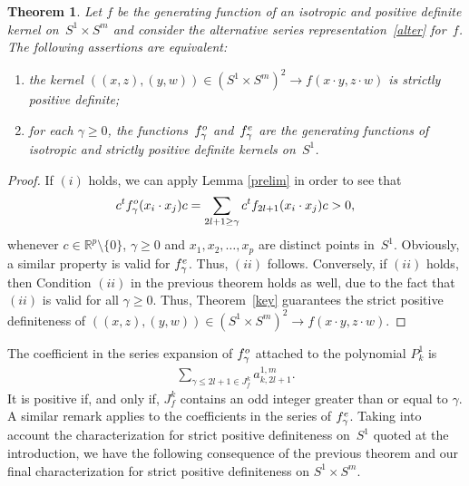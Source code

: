 \documentclass[11pt]{article}
\numberwithin{equation}{section}
\newtheorem{Theorem}{Theorem}[section]
\begin{document}
\begin{Theorem}
Let $f$ be the generating function of an isotropic and positive definite kernel on~\mbox{$S^1 \times S^m$} and consider the alternative series representation~\eqref{alter} for~$f$. The following assertions are equivalent:
\begin{enumerate}\itemsep=0pt
\item[$(i)$] the kernel $((x,z), (y,w)) \in (S^1 \times S^m)^2 \to f(x \cdot y, z \cdot w)$ is strictly positive definite;
\item[$(ii)$] for each $\gamma \geq 0$, the functions~$f_\gamma^{\rm o}$ and~$f_{\gamma}^{\rm e}$ are the generating functions of isotropic and strictly positive definite kernels on~$S^1$.
\end{enumerate}
\end{Theorem}
\begin{proof} If $(i)$ holds, we can apply Lemma \ref{prelim} in order to see that
\begin{gather*}c^t f_\gamma^{\rm o}(x_i \cdot x_j)c =\sum_{2l+1\geq \gamma} c^t f_{2l+1}(x_i \cdot x_j)c >0,\end{gather*}
whenever $c \in \mathbb{R}^p\setminus\{0\}$, $\gamma \geq 0$ and $x_1, x_2, \ldots, x_p$ are distinct points in~$S^1$. Obviously, a similar property is valid for
$f_\gamma^{\rm e}$. Thus, $(ii)$ follows. Conversely, if $(ii)$ holds, then Condition $(ii)$ in the previous theorem holds as well, due to the fact that $(ii)$ is valid for all $\gamma\geq 0$. Thus, Theo\-rem~\ref{key} guarantees the strict positive def\/initeness of $((x,z), (y,w)) \in (S^1 \times S^m)^2 \to f(x \cdot y, z \cdot w)$.
\end{proof}

The coef\/f\/icient in the series expansion of $f_\gamma^{\rm o}$ attached to the polynomial $P_k^1$ is
\begin{gather*}\sum_{\gamma \leq 2l+1 \in J_f^k} a_{k,2l+1}^{1,m}.\end{gather*}
It is positive if, and only if, $J_f^k$ contains an odd integer greater than or equal to $\gamma$. A similar remark applies to the coef\/f\/icients in the series of $f_\gamma^{\rm e}$. Taking into account the characterization for strict positive def\/initeness on~$S^1$ quoted at the introduction, we have the following consequence of the previous theorem and our f\/inal characterization for strict positive def\/initeness on $S^1 \times S^m$.
\end{document}
